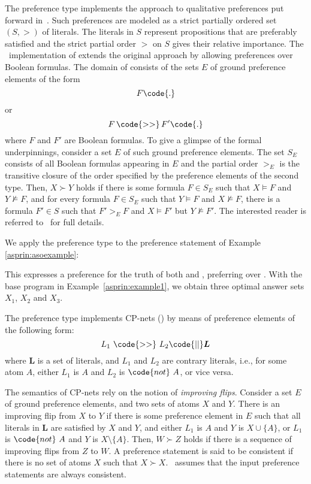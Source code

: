 The preference type  implements the approach to qualitative preferences put forward in~\cite{giumar12a}.
Such preferences are modeled as a strict partially ordered set
\(
(S,>)
\)
of literals.
The literals in $S$ represent propositions that are preferably satisfied
and the strict partial order $>$ on $S$ gives their relative importance.
%
The \asprin\ implementation of  extends the original approach by allowing preferences over Boolean formulas.
The domain of  consists of the sets $E$ of ground preference elements of the form
\[F\code{.}\]
or 
\[F \, \code{>>} \, F'\code{.}\]
where $F$ and $F'$ are Boolean formulas.
%
To give a glimpse of the formal underpinnings,
consider a set $E$ of such ground preference elements.
The set $S_E$ consists of all Boolean formulas appearing in $E$
and the partial order $>_E$ is the transitive closure of the order 
specified by the preference elements of the second type. 
Then, $X \succ Y$ holds if 
there is some formula $F \in S_E$ such that $X \models F$ and $Y \not\models F$, 
and for every formula $F \in S_E$ such that $Y \models F$ and $X \not\models F$, 
there is a formula
$F'\in S$ such that $F'>_{E}F$ and $X \models F'$ but $Y \not\models F'$.  The interested reader is referred to~\cite{giumar12a} for full details.  %
\begin{example}
%
%
We apply the preference type  to the preference statement of Example \ref{asprin:asoexample}:
%

%
This expresses a preference for the truth of both  and , 
preferring \code{a/1} over \code{b/1}.
With the base program in Example~\ref{asprin:example1}, 
we obtain three optimal answer sets $X_1$, $X_2$ and $X_3$.  
\end{example} %

\label{asprin:cp}
The preference type  implements CP-nets (\cite{bobrdohopo04a}) by means of 
preference elements of the following form:
\[ L_1 \ \code{>>} \ L_2 \code{ || } \boldsymbol{L}\]
where $\boldsymbol{L}$ is a set of literals,
and $L_1$ and $L_2$ are contrary literals,
i.e., for some atom $A$, either $L_1$ is $A$ and $L_2$ is $\code{not}~A$, or vice versa.

The semantics of CP-nets rely on the notion of \emph{improving flips}.
%
Consider a set $E$ of ground preference elements,
and two sets of atoms $X$ and $Y$.
%
There is an improving flip from $X$ to $Y$ if there is some preference element in $E$ such that
all literals in $\boldsymbol{L}$ are satisfied by $X$ and $Y$, and
either $L_1$ is $A$ and $Y$ is $X\cup\{A\}$, or
$L_1$ is $\code{not}~A$ and $Y$ is $X\setminus\{A\}$.
%
Then, $W \succ Z$ holds if there is a sequence of improving flips from $Z$ to $W$.
%
A preference statement is said to be consistent if there is no set of atoms $X$
such that $X \succ X$.
% 
\asprin\ assumes that the input  preference statements are always consistent.

